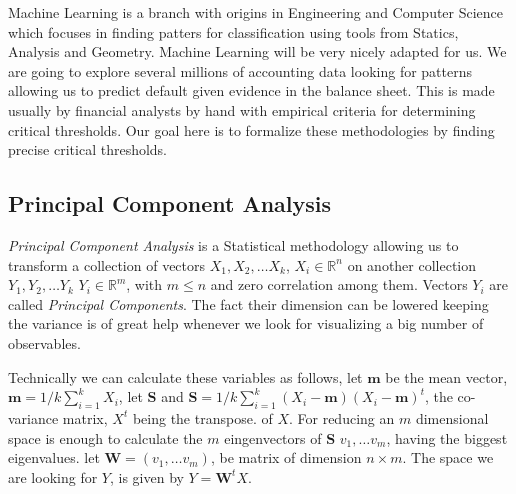 \documentclass[DIV=calc, paper=a4, fontsize=11pt, twocolumn]{scrartcl}
\begin{document}
Machine Learning is a branch with origins in Engineering and Computer Science which focuses in finding patters for classification using 
tools from Statics, Analysis and Geometry.
Machine Learning will be very nicely adapted for us. We are going to explore several millions of accounting data looking
for patterns allowing us to predict default given evidence in the balance sheet.
This is made usually by financial analysts by hand with empirical criteria for determining critical thresholds.
Our goal here is to formalize these methodologies by finding precise critical thresholds.


\subsection{Principal Component Analysis}
\emph{Principal Component Analysis} is a Statistical methodology allowing us to transform
a collection of vectors $X_1, X_2, \ldots X_k$, $X_i \in \mathbb{R}^n$ on another collection
$Y_1, Y_2, \ldots Y_k$ $Y_i \in \mathbb{R}^m$, with $m \leq n$ and zero correlation among them.
Vectors $Y_i$ are called \emph{Principal Components}. The fact their dimension can be lowered keeping the variance is of great help whenever we look for visualizing a big number of observables.

Technically we can calculate these variables as follows, let $\mathbf{m}$ 
be the mean vector, $\mathbf{m} = 1/k\sum_{i=1}^k X_i$, let $\mathbf{S}$ and  
$\mathbf{S} = 1/k \sum_{i=1}^k (X_i - \mathbf{m})(X_i - \mathbf{m})^t$, the co-variance matrix, $X^t$ being the transpose.
  of $X$. For reducing an $m$ dimensional space is enough to calculate the $m$ eingenvectors of $\mathbf{S}$ $v_1, \ldots v_m$, having the biggest eigenvalues. 
let $\mathbf{W} = (v_1, \ldots v_m)$, be matrix of dimension $n \times m$. The space we are looking for $Y$, is given by $Y = \mathbf{W}^t X$.
\end{document}
